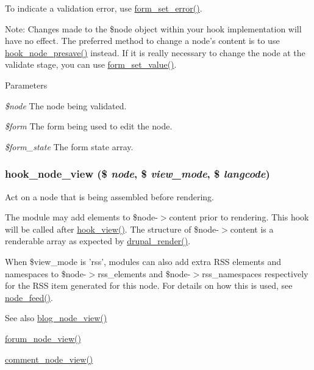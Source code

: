 To indicate a validation error, use \hyperlink{group__form__api_ga6f4ecbec42e905390e521b393417f97f}{form\_\-set\_\-error()}.

Note: Changes made to the \$node object within your hook implementation will have no effect. The preferred method to change a node's content is to use \hyperlink{group__node__api__hooks_gab339b1a1ce0e235d4a9c5a05e410dcd6}{hook\_\-node\_\-presave()} instead. If it is really necessary to change the node at the validate stage, you can use \hyperlink{group__form__api_ga2a377a1fcccea79d06d1a735dea433f3}{form\_\-set\_\-value()}.


\begin{DoxyParams}{Parameters}
\item[{\em \$node}]The node being validated. \item[{\em \$form}]The form being used to edit the node. \item[{\em \$form\_\-state}]The form state array. \end{DoxyParams}
\hypertarget{group__node__api__hooks_ga475290ee8e81a2373ea17c512cc3f9a9}{
\subsubsection[{hook\_\-node\_\-view}]{\setlength{\rightskip}{0pt plus 5cm}hook\_\-node\_\-view (\$ {\em node}, \/  \$ {\em view\_\-mode}, \/  \$ {\em langcode})}}
\label{group__node__api__hooks_ga475290ee8e81a2373ea17c512cc3f9a9}
Act on a node that is being assembled before rendering.

The module may add elements to \$node-\/$>$content prior to rendering. This hook will be called after \hyperlink{group__node__api__hooks_gab1f229603b5e0f2f9d9e2a3ab53dcbda}{hook\_\-view()}. The structure of \$node-\/$>$content is a renderable array as expected by \hyperlink{common_8inc_a05798b44e8d6c496d4bee5cc32fa7851}{drupal\_\-render()}.

When \$view\_\-mode is 'rss', modules can also add extra RSS elements and namespaces to \$node-\/$>$rss\_\-elements and \$node-\/$>$rss\_\-namespaces respectively for the RSS item generated for this node. For details on how this is used, see \hyperlink{node_8module_acad30bd6d2afbf584f622957c8f4718f}{node\_\-feed()}.

\begin{DoxySeeAlso}{See also}
\hyperlink{blog_8module_aef07831d7585949a6c1fffae85571598}{blog\_\-node\_\-view()} 

\hyperlink{forum_8module_a76349348d79c1557db47ffe253587ffd}{forum\_\-node\_\-view()} 

\hyperlink{comment_8module_af67cef07b57f84e54b8b26c38fe0fda0}{comment\_\-node\_\-view()}
\end{DoxySeeAlso}

